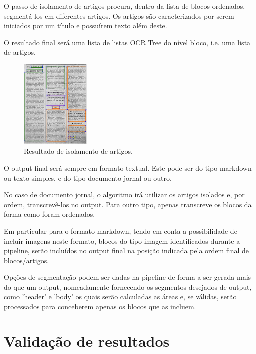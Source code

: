 

O passo de isolamento de artigos procura, dentro da lista de blocos ordenados, segmentá-los em diferentes artigos. Os artigos são caracterizados por serem iniciados por um título e possuírem texto além deste.

O resultado final será uma lista de listas OCR Tree do nível bloco, i.e. uma lista de artigos.

\begin{figure}[H]
	\centering
	\includegraphics[width=0.3\textwidth]{images/ilustracoes/pipeline_isolate_articles_example.png}
	\caption{Resultado de isolamento de artigos.}
	\label{fig:pipeline_isolate_articles_example}
\end{figure}




O output final será sempre em formato textual. Este pode ser do tipo markdown ou texto simples, e do tipo documento jornal ou outro. 

No caso de documento jornal, o algoritmo irá utilizar os artigos isolados e, por ordem, transcrevê-los no output. Para outro tipo, apenas transcreve os blocos da forma como foram ordenados.

Em particular para o formato markdown, tendo em conta a possibilidade de incluir imagens neste formato, blocos do tipo imagem identificados durante a pipeline, serão incluídos no output final na posição indicada pela ordem final de blocos/artigos.

Opções de segmentação podem ser dadas na pipeline de forma a ser gerada mais do que um output, nomeadamente fornecendo os segmentos desejados de output, como 'header' e 'body' os quais serão calculadas as áreas e, se válidas, serão processados para conceberem apenas os blocos que as incluem.



\section{Validação de resultados}
\label{sec:pipeline_validation}

